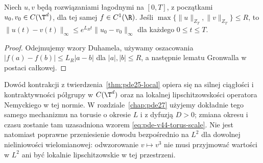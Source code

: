 \begin{twierdzenie}
\label{thm:pde25-stability}
Niech $u,v$ będą rozwiązaniami łagodnymi na $[0,T]$,
z początkami $u_0,v_0\in C(\T^d)$, dla tej samej
$f\in C^1(\R)$. Jeśli
$\max\{\|u\|_{Z_T},\|v\|_{Z_T}\}\le R$, to
$\|u(t)-v(t)\|_\infty\le e^{L_Rt}\|u_0-v_0\|_\infty$
dla każdego $0\le t\le T$.
\end{twierdzenie}
\begin{proof}
Odejmujemy wzory Duhamela, używamy oszacowania
$|f(a)-f(b)|\le L_R|a-b|$ dla $|a|,|b|\le R$,
a następnie lematu Gronwalla w postaci całkowej.
\end{proof}


\begin{uwaga}
\label{rem:pde-v44-picard-scaling}
Dowód kontrakcji z twierdzenia~\ref{thm:pde25-local} opiera się na
silnej ciągłości i kontraktywności półgrupy w $C(\T^d)$ oraz na
lokalnej lipschitzowskości operatora Nemyckiego w tej normie.
W rozdziale~\ref{chap:pde27} użyjemy dokładnie tego samego
mechanizmu na torusie o okresie $L$ i z dyfuzją $D>0$;
zmiana okresu i czasu zostanie tam uzasadniona wzorem
\eqref{eq:pde-v44-torus-scale}. Nie jest natomiast poprawne
przeniesienie dowodu bezpośrednio na $L^2$ dla dowolnej
nieliniowości wielomianowej: odwzorowanie $v\mapsto v^3$
nie musi przyjmować wartości w $L^2$ ani być lokalnie
lipschitzowskie w tej przestrzeni.
\end{uwaga}



